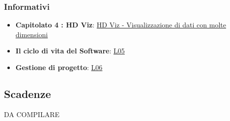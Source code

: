 	\subsubsection{Informativi}
		\begin{itemize}
			\item \textbf{Capitolato 4 : HD Viz}: \href{https://www.math.unipd.it/~tullio/IS-1/2020/Progetto/C4.pdf}{HD Viz - Visualizzazione di dati con molte dimensioni}
			\item \textbf{Il ciclo di vita del Software}: \href{https://www.math.unipd.it/~tullio/IS-1/2020/Dispense/L05.pdf}{L05}
			\item \textbf{Gestione di progetto}: \href{https://www.math.unipd.it/~tullio/IS-1/2020/Dispense/L06.pdf}{L06}
		\end{itemize}
\subsection{Scadenze}
	DA COMPILARE